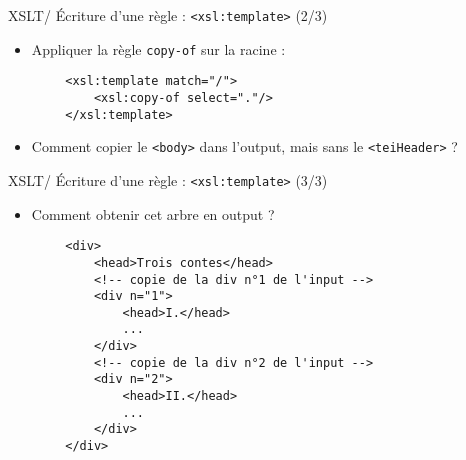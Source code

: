 \documentclass{beamer}
\begin{document}
        \begin{frame}[fragile]{XSLT/ Écriture d'une règle : \texttt{<xsl:template>} (2/3)}
            \Large
            \begin{itemize}
                \item Appliquer la règle \texttt{copy-of} sur la racine :
            \end{itemize}

            \begin{verbatim}
        <xsl:template match="/">
            <xsl:copy-of select="."/>
        </xsl:template>
            \end{verbatim}

            \begin{itemize}
                \item Comment copier le \texttt{<body>} dans l'output, mais sans le \texttt{<teiHeader>} ?
            \end{itemize}
        \end{frame}

        \begin{frame}[fragile]{XSLT/ Écriture d'une règle : \texttt{<xsl:template>} (3/3)}
        \Large
            \begin{itemize}
                \item Comment obtenir cet arbre en output ?
            \end{itemize}
            \normalsize
            \begin{verbatim}
        <div>
            <head>Trois contes</head>
            <!-- copie de la div n°1 de l'input -->
            <div n="1">
                <head>I.</head>
                ...
            </div>
            <!-- copie de la div n°2 de l'input -->
            <div n="2">
                <head>II.</head>
                ...
            </div>
        </div>
            \end{verbatim}
            
        \end{frame}
\end{document}

